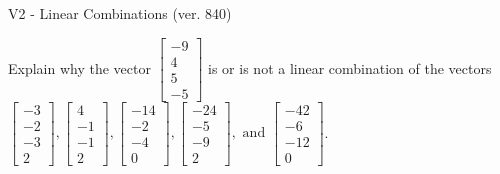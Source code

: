 \begin{exercise}
  \begin{exerciseTitle}V2 - Linear Combinations (ver. 840)\end{exerciseTitle}
  \begin{exerciseStatement}
    Explain why the vector \(\left[\begin{array}{c}
-9 \\
4 \\
5 \\
-5
\end{array}\right]\)  is or is not a linear 
	combination of the vectors \(\left[\begin{array}{c}
-3 \\
-2 \\
-3 \\
2
\end{array}\right] , \left[\begin{array}{c}
4 \\
-1 \\
-1 \\
2
\end{array}\right] , \left[\begin{array}{c}
-14 \\
-2 \\
-4 \\
0
\end{array}\right] , \left[\begin{array}{c}
-24 \\
-5 \\
-9 \\
2
\end{array}\right] , \text{ and } \left[\begin{array}{c}
-42 \\
-6 \\
-12 \\
0
\end{array}\right]\).
	



\end{exerciseStatement}
\end{exercise}
